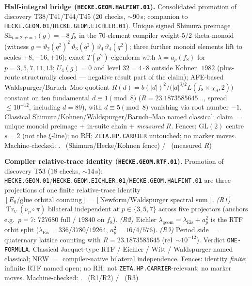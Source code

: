 \par\smallskip\noindent\textbf{Half-integral bridge
(\texttt{HECKE.GEOM.HALFINT.01}).}
Consolidated promotion of discovery T38/T41/T44/T45 ($20$ checks, $\sim90$\,s; companion
to \texttt{HECKE.GEOM.01}/\texttt{HECKE.GEOM.EICHLER.01}). Unique signed Shimura preimage
$\mathrm{Sh}_{t=2,\psi=1}(g)=-8\,f_8$ in the $70$-element compiler weight-$5/2$
theta-monoid (witness
$g=\vartheta_2(q^2)^2\,\vartheta_3(q^2)\,\vartheta_4\,\vartheta_4(q^2)$; three further
monoid elements lift to scales $+8,-16,+16$); exact $T(p^2)$-eigenform with
$\lambda=a_p(f_8)$ for $p=3,5,7,11,13$; $U_4(g)=0$ and level $32=4\cdot8$ outside
Kohnen~$1982$ (plus-route structurally closed --- negative result part of the claim);
AFE-based Waldspurger/Baruch--Mao quotient
$R(d)=b(|d|)^2\big/\bigl(|d|^{3/2}L(f_8\times\chi_d,2)\bigr)$ constant on ten
fundamental $d\equiv1\pmod8$ ($R=23.1873585645\ldots$, spread $\le10^{-12}$, including
$d=89$), with $d\equiv5\pmod8$ vanishing via root number $-1$. Classical
Shimura/Kohnen/Waldspurger/Baruch--Mao named classical; claim $=$ unique monoid preimage
$+$ in-suite chain $+$ \emph{measured} $R$. Fences: GL$(2)$ centre $s=2$ (not the
$\xi$-line); no RH; \texttt{ZETA.HP.CARRIER} untouched; no marker moves.
Machine-checked: .
\mE\ (Shimura/Hecke/Kohnen fence) / \mC\ (measured $R$)


\par\smallskip\noindent\textbf{Compiler relative-trace identity
(\texttt{HECKE.GEOM.RTF.01}).}
Promotion of discovery T53 ($18$ checks, $\sim14$\,s):
\texttt{HECKE.GEOM.01}/\texttt{HECKE.GEOM.EICHLER.01}/\texttt{HECKE.GEOM.HALFINT.01}
are three projections of one finite relative-trace identity
$[\text{$E_8$/glue orbital counting}]=[\text{Newform/Waldspurger spectral sum}]$.
\emph{(R1)} $\operatorname{Tr}_V(\nu_p\circ\pi)$ bilateral independent at
$p\in\{3,5,7\}$ across five projectors (anchors e.g.\ $p{=}7$: $727680$ full /
$19840$ on $f_8$).
\emph{(R2)} Eichler $\lambda_{\mathrm{geom}}=\lambda_{\mathrm{Eis}}+a_p^2$ is the RTF
orbit split ($\lambda_{\mathrm{Eis}}=336/3780/19264$, $a_p^2=16/4/576$).
\emph{(R3)} Period side $=$ quaternary lattice counting with
$R=23.1873585645$ (rel~$\sim10^{-12}$). Verdict \texttt{ONE-FORMULA}.
Classical Jacquet-type RTF / Eichler / Witt / Waldspurger named classical; NEW $=$
compiler-native bilateral independence. Fences: identity \emph{finite}; infinite RTF
named open; no RH; not \texttt{ZETA.HP.CARRIER}-relevant; no marker moves.
Machine-checked: .
\mE\ (R1/R2) / \mC\ (R3)


